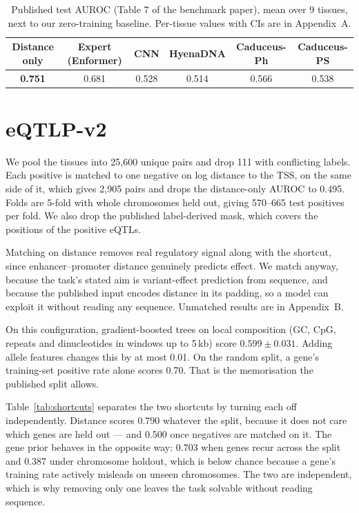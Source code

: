 \begin{table}[tb]
\centering
\caption{Published test AUROC (Table 7 of the benchmark paper), mean over 9
tissues, next to our zero-training baseline. Per-tissue values with CIs are in
Appendix~A.}
\label{tab:published}
\small
\begin{tabular}{cccccc}
\toprule
Distance only & Expert (Enformer) & CNN & HyenaDNA & Caduceus-Ph & Caduceus-PS \\
\midrule
\textbf{0.751} & 0.681 & 0.528 & 0.514 & 0.566 & 0.538 \\
\bottomrule
\end{tabular}
\end{table}

\section{eQTLP-v2}

We pool the tissues into 25,600 unique pairs and drop 111 with conflicting
labels. Each positive is matched to one negative on log distance to the TSS, on
the same side of it, which gives 2,905 pairs and drops the distance-only AUROC to
0.495. Folds are 5-fold with whole chromosomes held out, giving 570--665 test
positives per fold. We also drop the published label-derived mask, which covers
the positions of the positive eQTLs.

Matching on distance removes real regulatory signal along with the shortcut,
since enhancer--promoter distance genuinely predicts effect. We match anyway,
because the task's stated aim is variant-effect prediction from sequence, and
because the published input encodes distance in its padding, so a model can
exploit it without reading any sequence. Unmatched results are in Appendix~B.

On this configuration, gradient-boosted trees on local composition (GC, CpG,
repeats and dinucleotides in windows up to 5\,kb) score $\mathbf{0.599 \pm
0.031}$. Adding allele features changes this by at most 0.01. On the random
split, a gene's training-set positive rate alone scores 0.70. That is the
memorisation the published split allows.

\ifdefined\RECOMB
Table~\ref{tab:shortcuts} separates the two shortcuts by turning each off
independently. Distance scores 0.790 whatever the split, because it does not care
which genes are held out --- and 0.500 once negatives are matched on it. The
gene prior behaves in the opposite way: 0.703 when genes recur across the split
and 0.387 under chromosome holdout, which is below chance because a gene's
training rate actively misleads on unseen chromosomes. The two are independent,
which is why removing only one leaves the task solvable without reading sequence.


